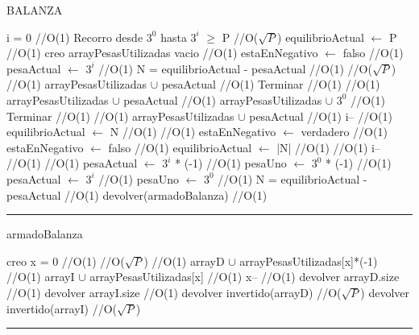 \begin{algorithm}[H]
\caption{BALANZA}
\begin{algorithmic}[1]
\state i = 0 \hfill //O(1)
\state Recorro desde $3^0$ hasta $3^i$ $\geq$ P  \hfill //O($\sqrt{P}$)
\state equilibrioActual  $\gets$ P \hfill //O(1)
\state creo arrayPesasUtilizadas vacio \hfill //O(1)
\state estaEnNegativo $\gets$ falso \hfill //O(1)
\state pesaActual  $\gets$  {$3^i$} \hfill //O(1)
\state N = equilibrioActual - pesaActual \hfill //O(1)
 \hfill //O($\sqrt{P}$)
 \hfill //O(1)
\state arrayPesasUtilizadas $\cup$ pesaActual \hfill //O(1)
\state Terminar \hfill //O(1)
\endif
{} \hfill //O(1)
\state arrayPesasUtilizadas $\cup$ pesaActual \hfill //O(1)
\state arrayPesasUtilizadas $\cup$ {$3^0$} \hfill //O(1)
\state Terminar \hfill //O(1)
\endif
{} \hfill //O(1)
\state arrayPesasUtilizadas $\cup$ pesaActual \hfill //O(1)
\state i-- \hfill //O(1)
\state equilibrioActual $\gets$ N \hfill //O(1)
 \hfill //O(1)
\state estaEnNegativo $\gets$  verdadero \hfill //O(1)
\Else
\state estaEnNegativo $\gets$  falso \hfill //O(1)
\endif
\state equilibrioActual $\gets$ |N| \hfill //O(1)
\endif
{} \hfill //O(1)
\state i-- \hfill //O(1)
\endif
{} \hfill //O(1)
\state pesaActual  $\gets$  {$3^i$} * (-1) \hfill //O(1)
\state pesaUno  $\gets$  {$3^0$} * (-1) \hfill //O(1)
\Else
\state pesaActual  $\gets$  {$3^i$} \hfill //O(1)
\state pesaUno  $\gets$  {$3^0$}  \hfill //O(1)
\endif
\state N = equilibrioActual - pesaActual \hfill //O(1)
\endwhile
\state devolver(armadoBalanza) \hfill //O(1)
\EndFunction 
\end{algorithmic}
\hrule
{}
\end{algorithm}

\begin{algorithm}[H]
\caption{armadoBalanza}
\begin{algorithmic}[1]
\state creo x = 0 \hfill //O(1)
 \hfill //O($\sqrt{P}$)
 \hfill //O(1)
\state arrayD $\cup$ arrayPesasUtilizadas[x]*(-1) \hfill //O(1)
\Else
\state arrayI $\cup$ arrayPesasUtilizadas[x] \hfill //O(1)
\endif
\state x-- \hfill //O(1)
\endwhile
\state devolver arrayD.size \hfill //O(1)
\state devolver arrayI.size \hfill //O(1)
\state devolver invertido(arrayD) \hfill //O($\sqrt{P}$)
\state devolver invertido(arrayI) \hfill //O($\sqrt{P}$)
\EndFunction 
\end{algorithmic}
\hrule
{}
\end{algorithm}